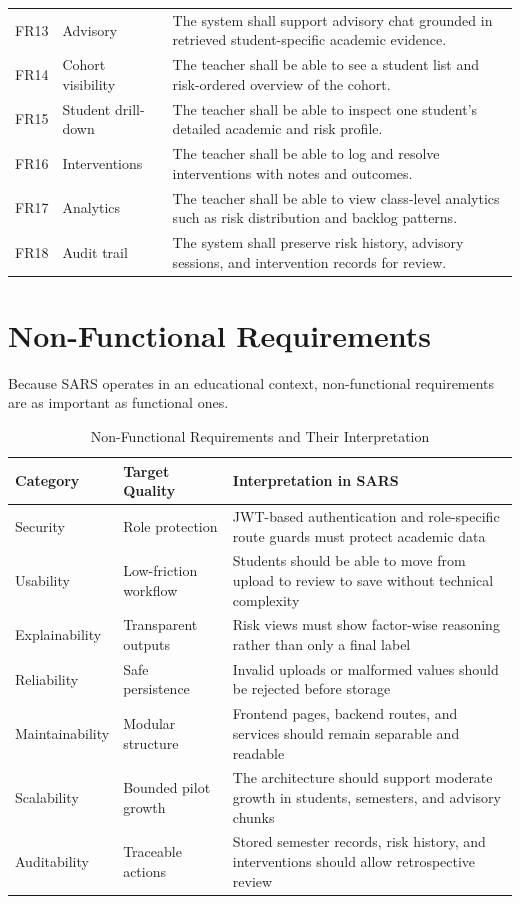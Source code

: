 \begin{longtable}{p{}p{}p{}}
FR13 & Advisory & The system shall support advisory chat grounded in retrieved student-specific academic evidence. \\
FR14 & Cohort visibility & The teacher shall be able to see a student list and risk-ordered overview of the cohort. \\
FR15 & Student drill-down & The teacher shall be able to inspect one student's detailed academic and risk profile. \\
FR16 & Interventions & The teacher shall be able to log and resolve interventions with notes and outcomes. \\
FR17 & Analytics & The teacher shall be able to view class-level analytics such as risk distribution and backlog patterns. \\
FR18 & Audit trail & The system shall preserve risk history, advisory sessions, and intervention records for review. \\
\bottomrule
\end{longtable}

\section{Non-Functional Requirements}
Because SARS operates in an educational context, non-functional requirements are as important as functional ones.

\begin{table}[H]
\centering
\caption{Non-Functional Requirements and Their Interpretation}
\begin{tabularx}{\textwidth}{>{\raggedright\arraybackslash}p{} >{\raggedright\arraybackslash}p{} >{\raggedright\arraybackslash}X}
\toprule
\textbf{Category} & \textbf{Target Quality} & \textbf{Interpretation in SARS} \\
\midrule
Security & Role protection & JWT-based authentication and role-specific route guards must protect academic data \\
Usability & Low-friction workflow & Students should be able to move from upload to review to save without technical complexity \\
Explainability & Transparent outputs & Risk views must show factor-wise reasoning rather than only a final label \\
Reliability & Safe persistence & Invalid uploads or malformed values should be rejected before storage \\
Maintainability & Modular structure & Frontend pages, backend routes, and services should remain separable and readable \\
Scalability & Bounded pilot growth & The architecture should support moderate growth in students, semesters, and advisory chunks \\
Auditability & Traceable actions & Stored semester records, risk history, and interventions should allow retrospective review \\
\bottomrule
\end{tabularx}
\end{table}

